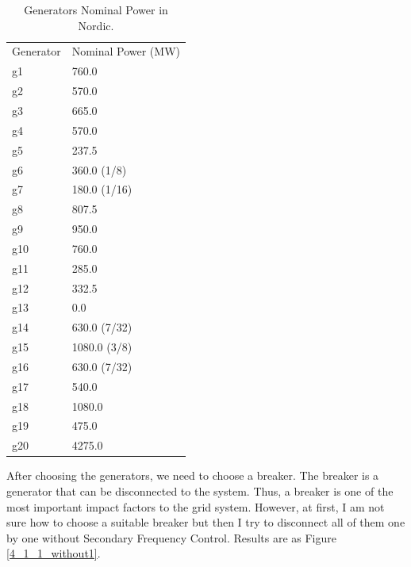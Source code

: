 \documentclass{report}
\begin{document}
\begin{table}[htbp]
\centering
\begin{tabular}{ll}
Generator & Nominal Power (MW) \\
g1        & 760.0              \\
g2        & 570.0              \\
g3        & 665.0              \\
g4        & 570.0              \\
g5        & 237.5              \\
g6        & 360.0 (1/8)        \\
g7        & 180.0 (1/16)       \\
g8        & 807.5              \\
g9        & 950.0              \\
g10       & 760.0              \\
g11       & 285.0              \\
g12       & 332.5              \\
g13       & 0.0                \\
g14       & 630.0 (7/32)       \\
g15       & 1080.0 (3/8)       \\
g16       & 630.0 (7/32)       \\
g17       & 540.0              \\
g18       & 1080.0             \\
g19       & 475.0              \\
g20       & 4275.0             

\end{tabular}
\caption{Generators Nominal Power in Nordic.}
\label{nominalPower}
\end{table}

After choosing the generators, we need to choose a breaker. The breaker is a generator that can be disconnected to the system. Thus, a breaker is one of the most important impact factors to the grid system. However, at first, I am not sure how to choose a suitable breaker but then I try to disconnect all of them one by one without Secondary Frequency Control. Results are as Figure \textcolor{red}{\ref{4_1_1_without1}}.\\
\end{document}
